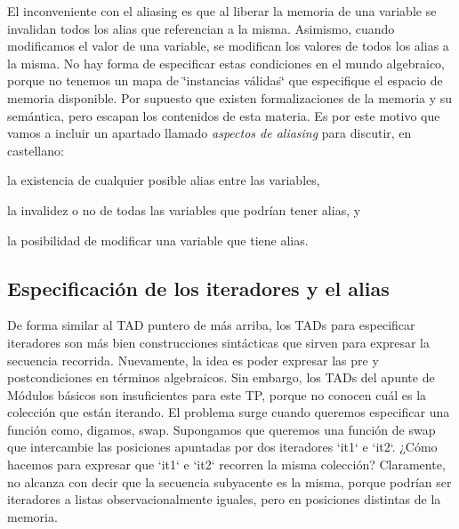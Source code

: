 \-El inconveniente con el aliasing es que al liberar la memoria de una variable se invalidan todos los alias que referencian a la misma. \-Asimismo, cuando modificamos el valor de una variable, se modifican los valores de todos los alias a la misma. \-No hay forma de especificar estas condiciones en el mundo algebraico, porque no tenemos un mapa de \char`\"{}instancias válidas\char`\"{} que especifique el espacio de memoria disponible. \-Por supuesto que existen formalizaciones de la memoria y su semántica, pero escapan los contenidos de esta materia. \-Es por este motivo que vamos a incluir un apartado llamado {\itshape aspectos de aliasing\/} para discutir, en castellano\-:
\begin{DoxyItemize}
\item la existencia de cualquier posible alias entre las variables,
\item la invalidez o no de todas las variables que podrían tener alias, y
\item la posibilidad de modificar una variable que tiene alias.
\end{DoxyItemize}\hypertarget{Aliasing_sec-iteradores}{}\subsection{\-Especificación de los iteradores y el alias}\label{Aliasing_sec-iteradores}
\-De forma similar al \-T\-A\-D puntero de más arriba, los \-T\-A\-Ds para especificar iteradores son más bien construcciones sintácticas que sirven para expresar la secuencia recorrida. \-Nuevamente, la idea es poder expresar las pre y postcondiciones en términos algebraicos. \-Sin embargo, los \-T\-A\-Ds del apunte de \-Módulos básicos son insuficientes para este \-T\-P, porque no conocen cuál es la colección que están iterando. \-El problema surge cuando queremos especificar una función como, digamos, swap. \-Supongamos que queremos una función de swap que intercambie las posiciones apuntadas por dos iteradores `it1` e `it2`. ¿\-Cómo hacemos para expresar que `it1` e `it2` recorren la misma colección? \-Claramente, no alcanza con decir que la secuencia subyacente es la misma, porque podrían ser iteradores a listas observacionalmente iguales, pero en posiciones distintas de la memoria.

